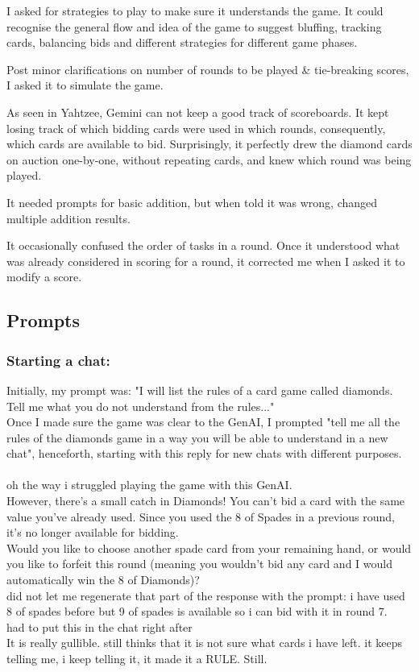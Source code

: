 \documentclass[runningheads]{llncs}
\begin{document}
I asked for strategies to play to make sure it understands the game. It could recognise the general flow and idea of the game to suggest bluffing, tracking cards, balancing bids and different strategies for different game phases.

Post minor clarifications on number of rounds to be played\cite{ref_rounds_played} \& tie-breaking scores, I asked it to simulate the game\cite{ref_simulate}.

As seen in Yahtzee\cite{ref_yahtzee_link}, Gemini can not keep a good track of scoreboards. It kept losing track of which bidding cards were used in which rounds, consequently, which cards are available to bid. Surprisingly, it perfectly drew the diamond cards on auction one-by-one, without repeating cards, and knew which round was being played.

It needed prompts for basic addition\cite{ref_addition}, but when told it was wrong, changed multiple addition results. 

It occasionally confused the order of tasks in a round. Once it understood what was already considered in scoring for a round, it corrected me when I asked it to modify a score\cite{ref_score_mess}. 


% 
\subsection{Prompts}
\subsubsection{Starting a chat:} Initially, my prompt was: "I will list the rules of a card game called diamonds. Tell me what you do not understand from the rules...\cite{ref_init_rules}"\\

Once I made sure the game was clear to the GenAI, I prompted "tell me all the rules of the diamonds game in a way you will be able to understand in a new chat", henceforth, starting with this reply\cite{ref_rules_genai} for new chats with different purposes.\\\\

oh the way i struggled playing the game with this GenAI.\\
However, there's a small catch in Diamonds! You can't bid a card with the same value you've already used. Since you used the 8 of Spades in a previous round, it's no longer available for bidding.
\\
Would you like to choose another spade card from your remaining hand, or would you like to forfeit this round (meaning you wouldn't bid any card and I would automatically win the 8 of Diamonds)?
\\ did not let me regenerate that part of the response with the prompt: i have used 8 of spades before but 9 of spades is available so i can bid with it in round 7.
\\ had to put this in the chat right after 
\\ It is really gullible. still thinks that it is not sure what cards i have left. it keeps telling me, i keep telling it, it made it a RULE. Still. \\
\end{document}
